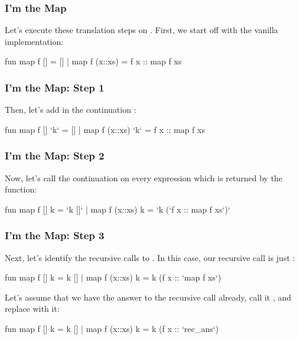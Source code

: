 \documentclass[aspectratio=169, handout]{beamer}
\begin{document}
\begin{frame}[fragile]
  \frametitle{I'm the Map}

  Let's execute these translation steps on . First, we start off with
  the vanilla implementation:

  \begin{codeblock}
    fun map f []      = []
      | map f (x::xs) =
          f x :: map f xs
  \end{codeblock}
\end{frame}

\begin{frame}[fragile]
  \frametitle{I'm the Map: Step 1}

  Then, let's add in the continuation :

  \begin{codeblock}
    fun map f [] `k`      = []
      | map f (x::xs) `k` =
          f x :: map f xs
  \end{codeblock}
\end{frame}

\begin{frame}[fragile]
  \frametitle{I'm the Map: Step 2}

  Now, let's call the continuation  on every expression which
  is returned by the function:

  \begin{codeblock}
    fun map f [] k      = `k []`
      | map f (x::xs) k =
          `k (`f x :: map f xs`)`
  \end{codeblock}
\end{frame}

\begin{frame}[fragile]
  \frametitle{I'm the Map: Step 3}

  Next, let's identify the recursive calls to . In this case,
  our recursive call  is just :

  \begin{codeblock}
    fun map f [] k      = k []
      | map f (x::xs) k =
          k (f x :: `map f xs`)
  \end{codeblock}

  \pause
  \vspace{\fill}

  Let's assume that we have the answer to the recursive call already, call it
  , and replace  with it:

  \begin{codeblock}
    fun map f [] k      = k []
      | map f (x::xs) k =
          k (f x :: `rec_ans`)
  \end{codeblock}
\end{frame}
\end{document}
